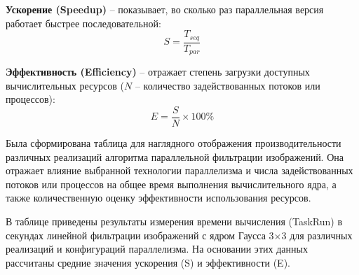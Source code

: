 \documentclass[14pt, a4paper]{extarticle}
\begin{document}
\textbf{Ускорение (Speedup)} – показывает, во сколько раз параллельная версия работает быстрее последовательной:
\[
S = \frac{T_{seq}}{T_{par}}
\]

\textbf{Эффективность (Efficiency)} – отражает степень загрузки доступных вычислительных ресурсов ($N$ – количество задействованных потоков или процессов):
\[
E = \frac{S}{N} \times 100\%
\]

Была сформирована таблица для наглядного отображения производительности различных реализаций алгоритма параллельной фильтрации изображений. Она отражает влияние выбранной технологии параллелизма и числа задействованных потоков или процессов на общее время выполнения вычислительного ядра, а также количественную оценку эффективности использования ресурсов.

В таблице приведены результаты измерения времени вычисления (TaskRun) в секундах линейной фильтрации изображений с ядром Гаусса 3×3 для различных реализаций и конфигураций параллелизма. На основании этих данных рассчитаны средние значения ускорения (S) и эффективности (E).
\end{document}
